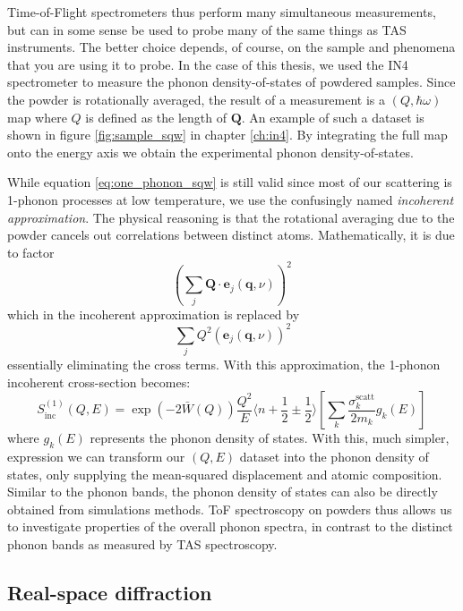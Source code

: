 Time-of-Flight spectrometers thus perform many simultaneous measurements, but can in some sense be used to probe many of the same things as TAS instruments. The better choice depends, of course, on the sample and phenomena that you are using it to probe. In the case of this thesis, we used the IN4 spectrometer to measure the phonon density-of-states of powdered samples. Since the powder is rotationally averaged, the result of a measurement is a $(Q,\hbar\omega)$ map where $Q$ is defined as the length of $\bm{Q}$. An example of such a dataset is shown in figure \ref{fig:sample_sqw} in chapter \ref{ch:in4}. By integrating the full map onto the energy axis we obtain the experimental phonon density-of-states.

While equation \ref{eq:one_phonon_sqw} is still valid since most of our scattering is 1-phonon processes at low temperature, we use the confusingly named \emph{incoherent approximation}. The physical reasoning is that the rotational averaging due to the powder cancels out correlations between distinct atoms. Mathematically, it is due to factor 
%
\[ \left( \sum_j \bm{Q} \cdot \bm{e}_j (\bm{q}, \nu) \right)^2 \, \]
%
which in the incoherent approximation is replaced by \cite{Carpenter1985}
%
\[ \sum_j  Q^2 \left( \bm{e}_j (\bm{q}, \nu) \right)^2 \]
%
essentially eliminating the cross terms. With this approximation, the 1-phonon incoherent cross-section becomes:
%
\[ S^{(1)}_{\mathrm{inc}}(Q,E) = \exp\left(-2\bar{W}(Q)\right) \frac{Q^2}{E} \langle n+\frac{1}{2}\pm\frac{1}{2} \rangle \left[ \sum_k \frac{\sigma_k^{\mathrm{scatt}}}{2m_k} g_k(E) \right]\, \]
%
where $g_k(E)$ represents the phonon density of states. With this, much simpler, expression we can transform our $(Q,E)$ dataset into the phonon density of states, only supplying the mean-squared displacement and atomic composition. Similar to the phonon bands, the phonon density of states can also be directly obtained from simulations methods. ToF spectroscopy on powders thus allows us to investigate properties of the overall phonon spectra, in contrast to the distinct phonon bands as measured by TAS spectroscopy.

\subsection{Real-space diffraction}

